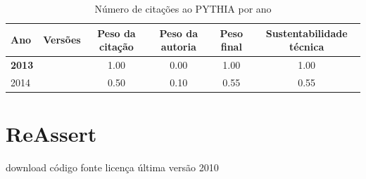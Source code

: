 \begin{table}[H]
\caption{Número de citações ao PYTHIA por ano}
\centering
\begin{tabular}{| l | c | c | c | c | c |}
  \hline
  Ano & Versões & Peso da citação & Peso da autoria & Peso final & Sustentabilidade técnica \\
  \hline
            {\bf 2013}
          &
          
          &
          1.00
          &
          0.00
          &
          1.00
          &
            {\color{blue} 1.00}
          \\
\hline
            2014
          &
          
          &
          0.50
          &
          0.10
          &
          0.55
          &
            {\color{blue} 0.55}
          \\
\hline
\end{tabular}
\end{table}



\section{ReAssert}
\checkmark download
\checkmark código fonte
\checkmark licença
\checkmark última versão 2010


